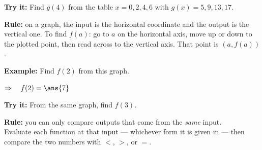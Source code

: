 \documentclass[12pt]{article}
\begin{document}
\begin{tryitbox}
\textbf{Try it:} \quad Find $g(4)$ from the table $x = 0, 2, 4, 6$ with $g(x) = 5, 9, 13, 17$.\\[2pt]
\end{tryitbox}


\begin{formulabox}
\textbf{Rule:} on a graph, the input is the horizontal coordinate and the output is the
vertical one. To find $f(a)$: go to $a$ on the horizontal axis, move up or down to the
plotted point, then read across to the vertical axis. That point is $(a, f(a))$.
\end{formulabox}

\begin{examplebox}
\textbf{Example:} \quad Find $f(2)$ from this graph.
\par\vspace{0.05cm}
\begin{center}
\end{center}
$\Rightarrow\quad f(2) = \ans{7}$
\end{examplebox}

\begin{tryitbox}
\textbf{Try it:} \quad From the same graph, find $f(3)$.\\[2pt]
\end{tryitbox}


\begin{formulabox}
\textbf{Rule:} you can only compare outputs that come from the \textit{same} input.\\[3pt]
Evaluate each function at that input --- whichever form it is given in --- then compare the two
numbers with $<$, $>$, or $=$.
\end{formulabox}
\end{document}
